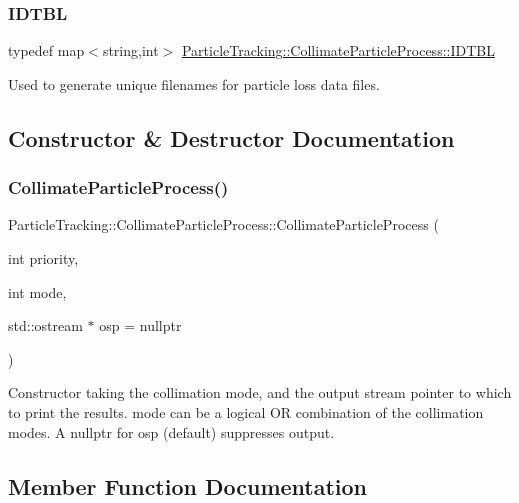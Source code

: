 \subsubsection{\texorpdfstring{I\+D\+T\+BL}{IDTBL}}
{\footnotesize\ttfamily typedef map$<$string,int$>$ \hyperlink{classParticleTracking_1_1CollimateParticleProcess_ac2ecc4232755ca120567b420af5b1dc8}{Particle\+Tracking\+::\+Collimate\+Particle\+Process\+::\+I\+D\+T\+BL}}

Used to generate unique filenames for particle loss data files. 

\subsection{Constructor \& Destructor Documentation}
\mbox{\label{classParticleTracking_1_1CollimateParticleProcess_ae93c881a9b08429d74a06627c55d4cd4}} 
\subsubsection{\texorpdfstring{Collimate\+Particle\+Process()}{CollimateParticleProcess()}}
{\footnotesize\ttfamily Particle\+Tracking\+::\+Collimate\+Particle\+Process\+::\+Collimate\+Particle\+Process (\begin{DoxyParamCaption}\item[{int}]{priority,  }\item[{int}]{mode,  }\item[{std\+::ostream $\ast$}]{osp = {\ttfamily nullptr} }\end{DoxyParamCaption})}

Constructor taking the collimation mode, and the output stream pointer to which to print the results. mode can be a logical OR combination of the collimation modes. A nullptr for osp (default) suppresses output. 

\subsection{Member Function Documentation}
\mbox{\label{classParticleTracking_1_1CollimateParticleProcess_a621e89e37cda11077f18dc3ff4980de8}} 
